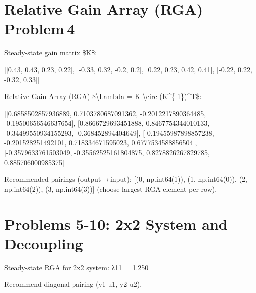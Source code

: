 \documentclass{article}%
\begin{document}
%
\section*{Relative Gain Array (RGA) – Problem 4}%
\label{sec:RelativeGainArray(RGA)Problem4}%
Steady‑state gain matrix \$K\$:%
\par%
{[}{[}0.43, 0.43, 0.23, 0.22{]}, {[}{-}0.33, 0.32, {-}0.2, 0.2{]}, {[}0.22, 0.23, 0.42, 0.41{]}, {[}{-}0.22, 0.22, {-}0.32, 0.33{]}{]}%
\par%
Relative Gain Array (RGA) \$\textbackslash{}Lambda = K \textbackslash{}circ (K\^{}\{{-}1\})\^{}T\$:%
\par%
{[}{[}0.6858502857936889, 0.7103780687091362, {-}0.2012217890364485, {-}0.19500656546637654{]}, {[}0.8666729693451888, 0.8467754344010133, {-}0.34499550934155293, {-}0.368452894404649{]}, {[}{-}0.19455987898857238, {-}0.201528251492101, 0.718334671595023, 0.6777534588856504{]}, {[}{-}0.3579633761503049, {-}0.35562525161804875, 0.8278826267829785, 0.885706000985375{]}{]}%
\par%
Recommended pairings (output → input): {[}(0, np.int64(1)), (1, np.int64(0)), (2, np.int64(2)), (3, np.int64(3)){]} (choose largest RGA element per row).%
\par

%
\section*{Problems 5{-}10: 2x2 System and Decoupling}%
\label{sec:Problems5{-}102x2SystemandDecoupling}%
Steady{-}state RGA for 2x2 system: λ11 = 1.250%
\par%
Recommend diagonal pairing (y1{-}u1, y2{-}u2).%
\par

%
\end{document}
